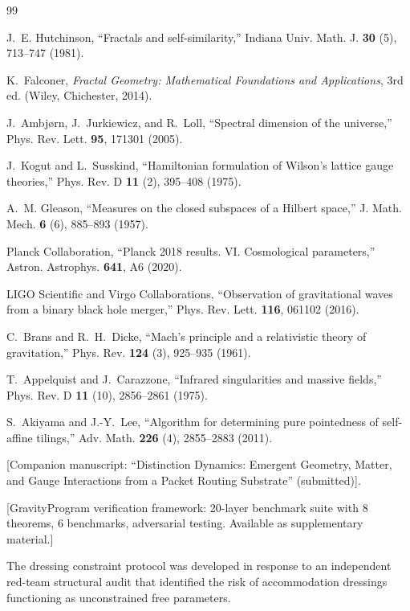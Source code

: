 \documentclass[11pt,twocolumn]{article}
\begin{document}
\begin{thebibliography}{99}

 J.~E. Hutchinson, ``Fractals and self-similarity,''
Indiana Univ. Math. J. \textbf{30} (5), 713--747 (1981).

 K.~Falconer, \textit{Fractal Geometry: Mathematical Foundations and Applications},
3rd ed. (Wiley, Chichester, 2014).

 J.~Ambj{\o}rn, J.~Jurkiewicz, and R.~Loll,
``Spectral dimension of the universe,''
Phys. Rev. Lett. \textbf{95}, 171301 (2005).

 J.~Kogut and L.~Susskind,
``Hamiltonian formulation of Wilson's lattice gauge theories,''
Phys. Rev. D \textbf{11} (2), 395--408 (1975).

 A.~M. Gleason,
``Measures on the closed subspaces of a Hilbert space,''
J. Math. Mech. \textbf{6} (6), 885--893 (1957).

 Planck Collaboration,
``Planck 2018 results. VI. Cosmological parameters,''
Astron. Astrophys. \textbf{641}, A6 (2020).

 LIGO Scientific and Virgo Collaborations,
``Observation of gravitational waves from a binary black hole merger,''
Phys. Rev. Lett. \textbf{116}, 061102 (2016).

 C.~Brans and R.~H.~Dicke,
``Mach's principle and a relativistic theory of gravitation,''
Phys. Rev. \textbf{124} (3), 925--935 (1961).

 T.~Appelquist and J.~Carazzone,
``Infrared singularities and massive fields,''
Phys. Rev. D \textbf{11} (10), 2856--2861 (1975).

 S.~Akiyama and J.-Y.~Lee,
``Algorithm for determining pure pointedness of self-affine tilings,''
Adv. Math. \textbf{226} (4), 2855--2883 (2011).

 [Companion manuscript: ``Distinction Dynamics: Emergent Geometry, Matter, and Gauge Interactions from a Packet Routing Substrate'' (submitted)].

 [GravityProgram verification framework: 20-layer benchmark suite with 8 theorems, 6 benchmarks, adversarial testing. Available as supplementary material.]

 The dressing constraint protocol was developed in response to an independent red-team structural audit that identified the risk of accommodation dressings functioning as unconstrained free parameters.


\end{thebibliography}
\end{document}
